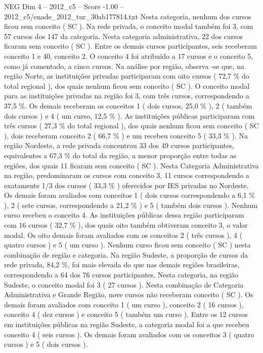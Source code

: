 \begin{textsample}{NEG Dim 4 – 2012\_c5 – Score -1.00 – 2012\_c5/enade\_2012\_tur\_30ab177814.txt}
Nesta categoria, nenhum dos cursos ficou sem conceito ( SC ).
Na rede privada, o conceito modal também foi 3, com 57 cursos dos 147 da categoria.
Nesta categoria administrativa, 22 dos cursos ficaram sem conceito ( SC ).
Entre os demais cursos participantes, seis receberam conceito 1 e 40, conceito 2.
O conceito 4 foi atribuído a 17 cursos e o conceito 5, como já comentado, a cinco cursos.
Na análise por região, observa -se que, na região Norte, as instituições privadas participaram com oito cursos ( 72,7 \% do total regional ), dos quais nenhum ficou sem conceito ( SC ).
O conceito modal para as instituições privadas na região foi 3, com três cursos, correspondendo a 37,5 \%.
Os demais receberam os conceitos 1 ( dois cursos, 25,0 \% ), 2 ( também dois cursos ) e 4 ( um curso, 12,5 \% ).
As instituições públicas participaram com três cursos ( 27,3 \% do total regional ), dos quais nenhum ficou sem conceito ( SC ), dois receberam conceito 2 ( 66,7 \% ) e um recebeu conceito 5 ( 33,3 \% ).
Na região Nordeste, a rede privada concentrou 33 dos 49 cursos participantes, equivalentes a 67,3 \% do total da região, a menor proporção entre todas as regiões, dos quais 11 ficaram sem conceito ( SC ).
Nesta Categoria Administrativa na região, predominaram os cursos com conceito 3, 11 cursos correspondendo a exatamente 1/3 dos cursos ( 33,3 \% ) oferecidos por IES privadas no Nordeste.
Os demais foram avaliados com conceitos 1 ( dois cursos correspondendo a 6,1 \% ), 2 ( sete cursos, correspondendo a 21,2 \% ) e 5 ( também dois cursos ).
Nenhum curso recebeu o conceito 4.
As instituições públicas dessa região participaram com 16 cursos ( 32,7 \% ), dos quais oito também obtiveram conceito 3, o valor modal.
Os oito demais foram avaliados com os conceitos 2 ( três cursos ), 4 ( quatro cursos ) e 5 ( um curso ).
Nenhum curso ficou sem conceito ( SC ) nesta combinação de região e categoria.
Na região Sudeste, a proporção de cursos da rede privada, 84,2 \%, foi mais elevada do que nas demais regiões brasileiras, correspondendo a 64 dos 76 cursos participantes.
Nesta categoria, na região Sudeste, o conceito modal foi 3 ( 27 cursos ).
Nesta combinação de Categoria Administrativa e Grande Região, nove cursos não receberam conceito ( SC ).
Os demais foram avaliados com conceito 1 ( um curso ), conceito 2 ( 16 cursos ), conceito 4 ( dez cursos ) e conceito 5 ( também um curso ).
Entre os 12 cursos em instituições públicas na região Sudeste, a categoria modal foi a que recebeu conceito 4 ( seis cursos ).
Os demais foram avaliados com os conceitos 3 ( quatro cursos ) e 5 ( dois cursos ).

\end{textsample}
